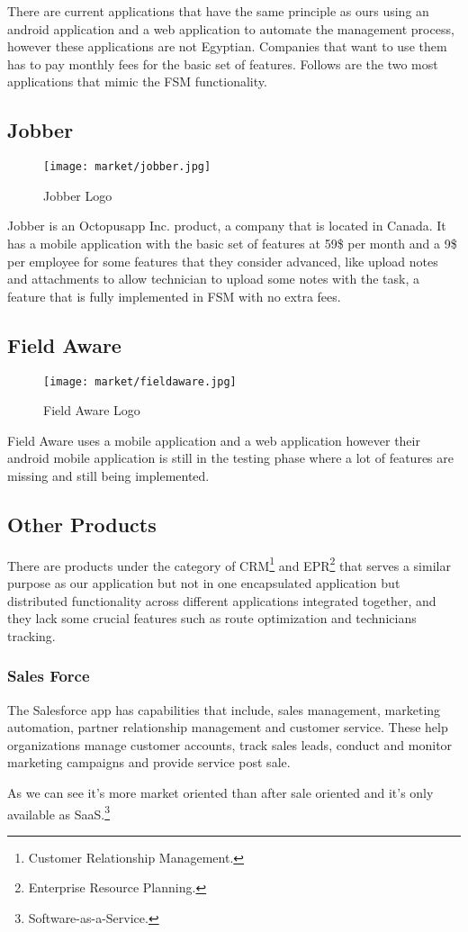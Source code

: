 There are current applications that have the same principle as ours using an android application and a web application to automate the management process, however these applications are not Egyptian. Companies that want to use them has to pay monthly fees for the basic set of features. Follows are the two most applications that mimic the FSM functionality.

\subsection{Jobber}
	\begin{figure}[ht]
		\centering
		\captionsetup{justification=centering}
		\texttt{[image: market/jobber.jpg]}
		\caption{Jobber Logo}
	\end{figure}
	Jobber is an Octopusapp Inc. product, a company that is located in Canada. It has a mobile application with the basic set of features at 59\$ per month and a 9\$ per employee for some features that they consider advanced, like upload notes and attachments to allow technician to upload some notes with the task, a feature that is fully implemented in FSM with no extra fees.
\subsection{Field Aware}
	\begin{figure}[ht]
		\centering
		\captionsetup{justification=centering}
		\texttt{[image: market/fieldaware.jpg]}
		\caption{Field Aware Logo}
	\end{figure}
	Field Aware uses a mobile application and a web application however their android mobile application is still in the testing phase where a lot of features are missing and still being implemented.

\subsection{Other Products}
	There are products under the category of CRM\footnote{Customer Relationship Management.} and EPR\footnote{Enterprise Resource Planning.} that serves a similar purpose as our application but not in one encapsulated application but distributed functionality across different applications integrated together, and they lack some crucial features such as route optimization and technicians tracking.
	\subsubsection{Sales Force}
		The Salesforce app has capabilities that include, sales management, marketing automation, partner relationship management and customer service. These help organizations manage customer accounts, track sales leads, conduct and monitor marketing campaigns and provide service post sale.
		
		As we can see it's more market oriented than after sale oriented and it's only available as SaaS.\footnote{Software-as-a-Service.}